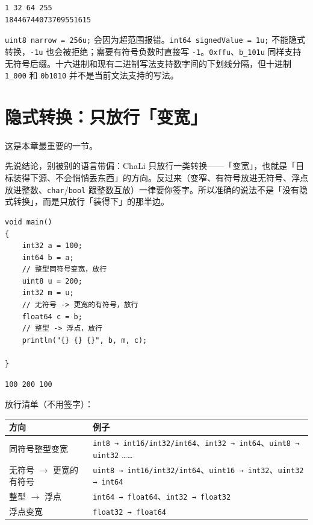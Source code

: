 \par
\medskip
\begin{lstlisting}[style=out]
1 32 64 255
18446744073709551615
\end{lstlisting}
\par
\medskip

\texttt{uint8 narrow =\allowbreak{} 256u;} 会因为超范围报错。\texttt{int64 signed\allowbreak{}Value =\allowbreak{} 1u;} 不能隐式转换，\texttt{-1u} 也会被拒绝；需要有符号负数时直接写 \texttt{-1}。\texttt{0xffu}、\texttt{b\_101u} 同样支持无符号后缀。十六进制和现有二进制写法支持数字间的下划线分隔，但十进制 \texttt{1\_000} 和 \texttt{0b1010} 并不是当前文法支持的写法。

\section{隐式转换：只放行「变宽」}

这是本章最重要的一节。

先说结论，别被别的语言带偏：ChaLi 只放行一类转换——「变宽」，也就是「目标装得下源、不会悄悄丢东西」的方向。反过来（变窄、有符号放进无符号、浮点放进整数、\texttt{char}/\texttt{bool} 跟整数互放）一律要你签字。所以准确的说法不是「没有隐式转换」，而是只放行「装得下」的那半边。

\par
\medskip
\begin{lstlisting}[style=chali]
void main()
{
    int32 a = 100;
    int64 b = a;
    // 整型同符号变宽，放行
    uint8 u = 200;
    int32 m = u;
    // 无符号 -> 更宽的有符号，放行
    float64 c = b;
    // 整型 -> 浮点，放行
    println("{} {} {}", b, m, c);

}
\end{lstlisting}
\par
\medskip

\par
\medskip
\begin{lstlisting}[style=out]
100 200 100
\end{lstlisting}
\par
\medskip

放行清单（不用签字）：

{\small\setlength{\tabcolsep}{4pt}
\begin{longtable}{>{\raggedright\arraybackslash}p{}>{\raggedright\arraybackslash}p{}}
\toprule
方向 & 例子 \\
\midrule
\endhead
同符号整型变宽 & \texttt{int8 → int16/\allowbreak{}int32/\allowbreak{}int64}、\texttt{int32 → int64}、\texttt{uint8 → uint32} …… \\
无符号 \ensuremath{\rightarrow} 更宽的有符号 & \texttt{uint8 → int16/\allowbreak{}int32/\allowbreak{}int64}、\texttt{uint16 → int32}、\texttt{uint32 → int64} \\
整型 \ensuremath{\rightarrow} 浮点 & \texttt{int64 → float64}、\texttt{int32 → float32} \\
浮点变宽 & \texttt{float32 → float64} \\
\bottomrule
\end{longtable}
}

